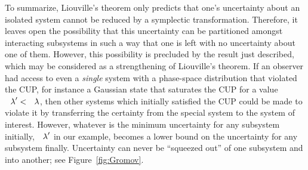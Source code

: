 \documentclass[pra,superscriptaddress,nofootinbib,12pt]{revtex4-2}
\begin{document}
To summarize, Liouville's theorem only predicts that one's uncertainty about an isolated system cannot be reduced by a symplectic transformation.  Therefore, it leaves open the possibility that this uncertainty can be partitioned amongst interacting subsystems in such a way that one is left with no uncertainty about one of them.  However, this possibility is precluded by the result just described, which may be considered as a strengthening of Liouville's theorem.  If an observer had access to even a \emph{single} system with a phase-space distribution that violated the CUP, for instance a Gaussian state that saturates the CUP for a value  $\lambdabar'<\lambdabar$, then other systems which initially satisfied the CUP could be made to violate it by transferring the certainty from the special system to the system of interest.  However, whatever is the minimum uncertainty for any subsystem initially, $\lambdabar'$ in our example, becomes a lower bound on the uncertainty for any subsystem finally.  Uncertainty can never be ``squeezed out'' of one subsystem and into another; see Figure~\ref{fig:Gromov}.
\end{document}
